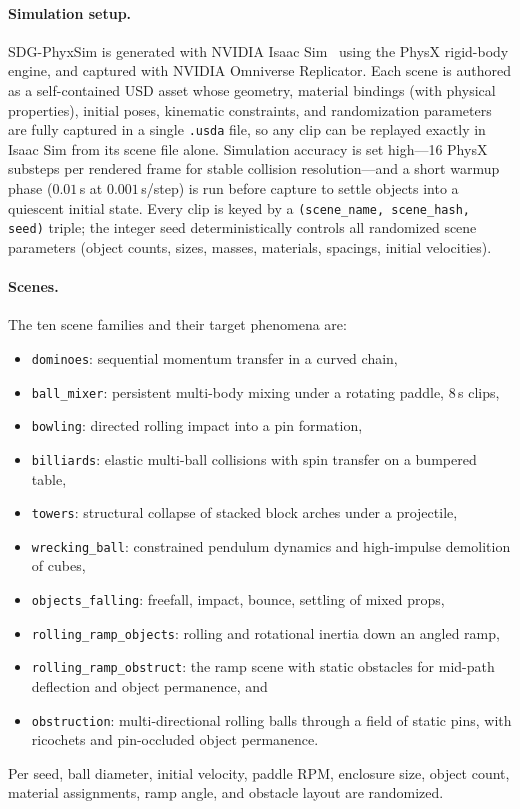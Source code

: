 \paragraph{Simulation setup.}
\label{appendix:sdg_phyxsim_simulation_setup}
SDG-PhyxSim is generated with NVIDIA Isaac Sim~\citep{nvidia_isaac_sim_2026} using the PhysX rigid-body
engine, and captured with NVIDIA Omniverse
Replicator. Each scene is authored as a self-contained USD asset whose
geometry, material bindings (with physical properties), initial poses,
kinematic constraints, and randomization parameters are fully captured in a
single \texttt{.usda} file, so any clip can be replayed exactly in Isaac Sim
from its scene file alone. Simulation accuracy is set high---16 PhysX
substeps per rendered frame for stable collision resolution---and a short
warmup phase ($0.01$\,s at $0.001$\,s/step) is run before capture to settle
objects into a quiescent initial state. Every clip is keyed by a
\texttt{(scene\_name, scene\_hash, seed)} triple; the integer seed
deterministically controls all randomized scene parameters (object counts,
sizes, masses, materials, spacings, initial velocities).

\paragraph{Scenes.}
\label{appendix:sdg_phyxsim_scenes}
The ten scene families and their target phenomena are:
\begin{itemize}
    \item \texttt{dominoes}: sequential momentum transfer in a curved chain,
    \item \texttt{ball\_mixer}: persistent multi-body mixing under a rotating paddle, $8$\,s clips,
    \item \texttt{bowling}: directed rolling impact into a pin formation,
    \item \texttt{billiards}: elastic multi-ball collisions with spin transfer on a bumpered table,
    \item \texttt{towers}: structural collapse of stacked block arches under a projectile,
    \item \texttt{wrecking\_ball}: constrained pendulum dynamics and high-impulse demolition of cubes,
    \item \texttt{objects\_falling}: freefall, impact, bounce, settling of mixed props,
    \item \texttt{rolling\_ramp\_objects}: rolling and rotational inertia down an angled ramp,
    \item \texttt{rolling\_ramp\_obstruct}: the ramp scene with static obstacles for mid-path deflection and object permanence,
    and
    \item \texttt{obstruction}: multi-directional rolling balls through a field of static pins, with ricochets and pin-occluded object permanence.
\end{itemize}
Per seed, ball diameter, initial velocity, paddle RPM, enclosure size, object count, material assignments, ramp angle, and obstacle layout are randomized.

